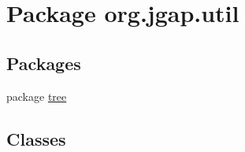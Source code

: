 \hypertarget{namespaceorg_1_1jgap_1_1util}{\section{Package org.\-jgap.\-util}
\label{namespaceorg_1_1jgap_1_1util}
}
\subsection*{Packages}
\begin{DoxyCompactItemize}
\item 
package \hyperlink{namespaceorg_1_1jgap_1_1util_1_1tree}{tree}
\end{DoxyCompactItemize}
\subsection*{Classes}
